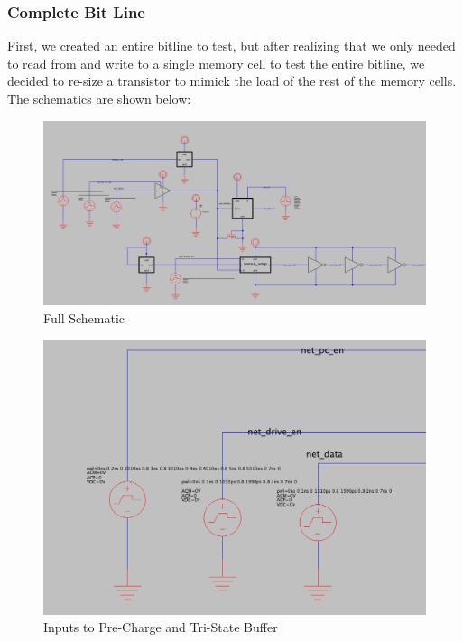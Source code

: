 \documentclass[a4paper]{article}
\begin{document}
\subsubsection{Complete Bit Line}
First, we created an entire bitline to test, but after realizing that we only needed to read from and write to a single memory cell to test the entire bitline, we decided to re-size a transistor to mimick the load of the rest of the memory cells. The schematics are shown below: 
\begin{figure}[H]
	\centering
	\includegraphics[scale=0.25]{exampleBitlineFull}
	\caption{Full Schematic}
	\label{fig:bitlineFull}
\end{figure}

\begin{figure}[H]
	\centering
	\includegraphics[scale=0.35]{exampleBitlineInputs}
	\caption{Inputs to Pre-Charge and Tri-State Buffer}
	\label{fig:bitlineInputs}
\end{figure}
\end{document}

